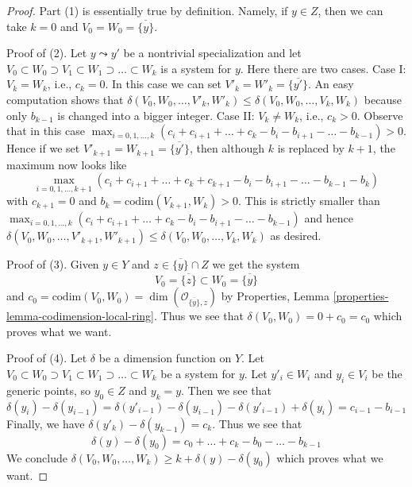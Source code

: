 \begin{proof}
Part (1) is essentially true by definition. Namely, if $y \in Z$,
then we can take $k = 0$ and $V_0 = W_0 = \overline{\{y\}}$.

\medskip\noindent
Proof of (2). Let $y \leadsto y'$ be a nontrivial specialization and let
$V_0 \subset W_0 \supset V_1 \subset W_1 \supset \ldots \subset W_k$
is a system for $y$. Here there are two cases.
Case I: $V_k = W_k$, i.e., $c_k = 0$. In this case
we can set $V'_k = W'_k = \overline{\{y'\}}$.
An easy computation shows that
$\delta(V_0, W_0, \ldots, V'_k, W'_k) \leq
\delta(V_0, W_0, \ldots, V_k, W_k)$
because only $b_{k - 1}$ is changed into a bigger integer.
Case II: $V_k \not = W_k$, i.e., $c_k > 0$. Observe that
in this case $\max_{i = 0, 1, \ldots, k}
(c_i + c_{i + 1} + \ldots + c_k - b_i - b_{i + 1} - \ldots - b_{k - 1}) > 0$.
Hence if we set $V'_{k + 1} = W_{k + 1} = \overline{\{y'\}}$,
then although $k$ is replaced by $k + 1$, the maximum now looks like
$$
\max_{i = 0, 1, \ldots, k + 1}
(c_i + c_{i + 1} + \ldots + c_k + c_{k + 1}
- b_i - b_{i + 1} - \ldots - b_{k - 1} - b_k)
$$
with $c_{k + 1} = 0$ and $b_k = \text{codim}(V_{k + 1}, W_k) > 0$.
This is strictly smaller than
$\max_{i = 0, 1, \ldots, k}
(c_i + c_{i + 1} + \ldots + c_k - b_i - b_{i + 1} - \ldots - b_{k - 1})$
and hence
$\delta(V_0, W_0, \ldots, V'_{k + 1}, W'_{k + 1}) \leq
\delta(V_0, W_0, \ldots, V_k, W_k)$ as desired.

\medskip\noindent
Proof of (3). Given $y \in Y$ and $z \in \overline{\{y\}} \cap Z$
we get the system
$$
V_0 = \overline{\{z\}} \subset W_0 = \overline{\{y\}}
$$
and $c_0 = \text{codim}(V_0, W_0) = \dim(\mathcal{O}_{\overline{\{y\}}, z})$
by Properties, Lemma \ref{properties-lemma-codimension-local-ring}.
Thus we see that $\delta(V_0, W_0) = 0 + c_0 = c_0$ which proves
what we want.

\medskip\noindent
Proof of (4). Let $\delta$ be a dimension function on $Y$.
Let $V_0 \subset W_0 \supset V_1 \subset W_1 \supset \ldots \subset W_k$
be a system for $y$. Let $y'_i \in W_i$ and $y_i \in V_i$ be the
generic points, so $y_0 \in Z$ and $y_k = y$. Then we see that
$$
\delta(y_i) - \delta(y_{i - 1}) =
\delta(y'_{i - 1}) - \delta(y_{i - 1}) - \delta(y'_{i - 1}) + \delta(y_i) =
c_{i - 1} - b_{i - 1}
$$
Finally, we have $\delta(y'_k) - \delta(y_{k - 1}) = c_k$.
Thus we see that
$$
\delta(y) - \delta(y_0) =
c_0 + \ldots + c_k - b_0 - \ldots - b_{k - 1}
$$
We conclude
$\delta(V_0, W_0, \ldots, W_k) \geq k + \delta(y) - \delta(y_0)$
which proves what we want.


\end{proof}
